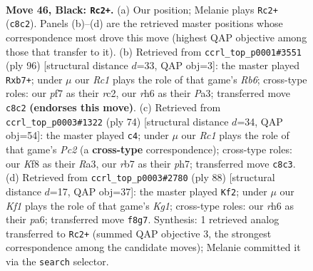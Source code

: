 \documentclass[11pt]{article}
\begin{document}
\clearpage

\begin{figure}[p]\centering
\begin{subfigure}{0.46\textwidth}\centering
\resizebox{\linewidth}{!}{%
\newchessgame
\chessboard[
  setfen={2r2k2/1R3P2/7R/8/1P3r1p/5B2/5K2/8 b - - 0 46},
  showmover=false,
  pgfstyle=straightmove, color=movearrow, markmove={c8-c2}
]}
\caption{}
\end{subfigure}\hfill
\begin{subfigure}{0.46\textwidth}\centering
\resizebox{\linewidth}{!}{%
\newchessgame
\chessboard[
  setfen={8/1p4k1/pR6/8/8/P7/2r2r2/1K5R w - - 2 49},
  showmover=false,
  pgfstyle=straightmove, color=movearrow, markmove={b6-b7}
]}
\caption{}
\end{subfigure}
\\[4pt]
\begin{subfigure}{0.46\textwidth}\centering
\resizebox{\linewidth}{!}{%
\newchessgame
\chessboard[
  setfen={1r6/3r2kp/8/1b1B4/pR5P/R7/2PK4/8 w - - 10 38},
  showmover=false,
  pgfstyle=straightmove, color=movearrow, markmove={c2-c4}
]}
\caption{}
\end{subfigure}\hfill
\begin{subfigure}{0.46\textwidth}\centering
\resizebox{\linewidth}{!}{%
\newchessgame
\chessboard[
  setfen={8/8/p6k/8/3rb1R1/8/P2p2p1/3R2K1 w - - 0 45},
  showmover=false,
  pgfstyle=straightmove, color=movearrow, markmove={g1-f2}
]}
\caption{}
\end{subfigure}
\caption{\textbf{Move 46, Black: \texttt{Rc2+}.} (a) Our position; Melanie plays \texttt{Rc2+} (\texttt{c8c2}). Panels (b)--(d) are the retrieved master positions whose correspondence most drove this move (highest QAP objective among those that transfer to it). (b) Retrieved from \texttt{ccrl\_top\_p0001\#3551} (ply 96) [structural distance $d$=33, QAP obj=3]: the master played \texttt{Rxb7+}; under $\mu$ our \emph{Rc1} plays the role of that game's \emph{Rb6}; cross-type roles: our \emph{p}f7 as their \emph{r}c2, our \emph{r}h6 as their \emph{P}a3; transferred move \texttt{c8c2} \textbf{(endorses this move)}. (c) Retrieved from \texttt{ccrl\_top\_p0003\#1322} (ply 74) [structural distance $d$=34, QAP obj=54]: the master played \texttt{c4}; under $\mu$ our \emph{Rc1} plays the role of that game's \emph{Pc2} (a \textbf{cross-type} correspondence); cross-type roles: our \emph{K}f8 as their \emph{R}a3, our \emph{r}b7 as their \emph{p}h7; transferred move \texttt{c8c3}. (d) Retrieved from \texttt{ccrl\_top\_p0003\#2780} (ply 88) [structural distance $d$=17, QAP obj=37]: the master played \texttt{Kf2}; under $\mu$ our \emph{Kf1} plays the role of that game's \emph{Kg1}; cross-type roles: our \emph{r}h6 as their \emph{p}a6; transferred move \texttt{f8g7}. Synthesis: 1 retrieved analog transferred to \texttt{Rc2+} (summed QAP objective 3, the strongest correspondence among the candidate moves); Melanie committed it via the \texttt{search} selector.}
\label{fig:thought-m91}
\end{figure}
\end{document}
